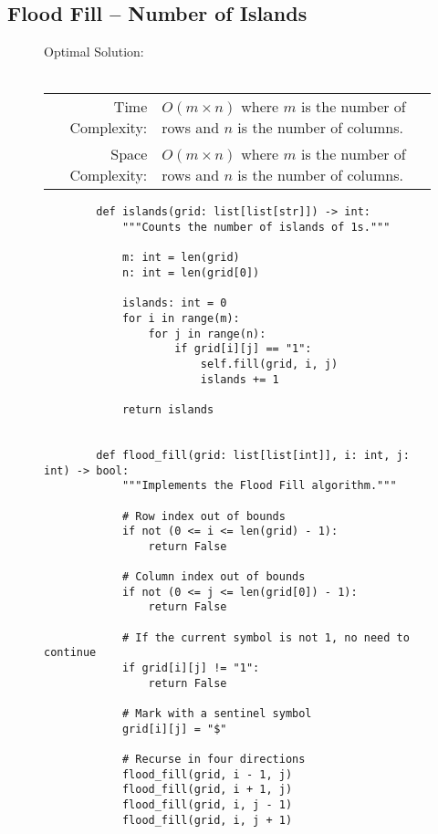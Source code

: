 
\subsection{Flood Fill -- Number of Islands}

\begin{figure}[H]
    Optimal Solution:\\\\
    \begin{tabular}{rl}
        Time Complexity:& \(O(m \times n)\) where \(m\) is the number of rows
        and \(n\) is the number of columns.\\
        Space Complexity:& \(O(m \times n)\) where \(m\) is the number of rows
        and \(n\) is the number of columns.
    \end{tabular}
\end{figure}

\begin{figure}[H]
    \centering
    \begin{verbatim}
        def islands(grid: list[list[str]]) -> int:
            """Counts the number of islands of 1s."""

            m: int = len(grid)
            n: int = len(grid[0])

            islands: int = 0
            for i in range(m):
                for j in range(n):
                    if grid[i][j] == "1":
                        self.fill(grid, i, j)
                        islands += 1

            return islands


        def flood_fill(grid: list[list[int]], i: int, j: int) -> bool:
            """Implements the Flood Fill algorithm."""

            # Row index out of bounds
            if not (0 <= i <= len(grid) - 1):
                return False

            # Column index out of bounds
            if not (0 <= j <= len(grid[0]) - 1):
                return False

            # If the current symbol is not 1, no need to continue
            if grid[i][j] != "1":
                return False

            # Mark with a sentinel symbol
            grid[i][j] = "$"

            # Recurse in four directions
            flood_fill(grid, i - 1, j)
            flood_fill(grid, i + 1, j)
            flood_fill(grid, i, j - 1)
            flood_fill(grid, i, j + 1)
    \end{verbatim}
\end{figure}
